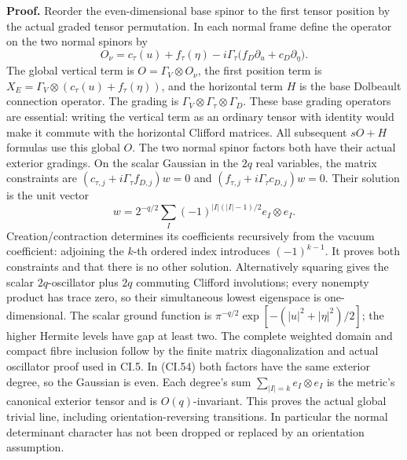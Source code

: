 \documentclass[
  11pt,
]{article}
\begin{document}
\textbf{Proof.} Reorder the even-dimensional base spinor to the first
tensor position by the actual graded tensor permutation. In each normal
frame define the operator on the two normal spinors by \[
 O_\nu=c_\tau(u)+f_\tau(\eta)
       -i\Gamma_\tau\bigl(f_D\partial_u+c_D\partial_\eta\bigr).
 \tag{CI.53}
\] The global vertical term is \(O=\Gamma_V\otimes O_\nu\), the first
position term is \(X_E=\Gamma_V\otimes(c_\tau(u)+f_\tau(\eta))\), and
the horizontal term \(H\) is the base Dolbeault connection operator. The
grading is \(\Gamma_V\otimes\Gamma_\tau\otimes\Gamma_D\). These base
grading operators are essential: writing the vertical term as an
ordinary tensor with identity would make it commute with the horizontal
Clifford matrices. All subsequent \(sO+H\) formulas use this global
\(O\). The two normal spinor factors both have their actual exterior
gradings. On the scalar Gaussian in the \(2q\) real variables, the
matrix constraints are \((c_{\tau,j}+i\Gamma_\tau f_{D,j})w=0\) and
\((f_{\tau,j}+i\Gamma_\tau c_{D,j})w=0\). Their solution is the unit
vector \[
 w=2^{-q/2}\sum_{I}
       (-1)^{|I|(|I|-1)/2}e_I\otimes e_I .
 \tag{CI.54}
\] Creation/contraction determines its coefficients recursively from the
vacuum coefficient: adjoining the \(k\)-th ordered index introduces
\((-1)^{k-1}\). It proves both constraints and that there is no other
solution. Alternatively squaring gives the scalar \(2q\)-oscillator plus
\(2q\) commuting Clifford involutions; every nonempty product has trace
zero, so their simultaneous lowest eigenspace is one-dimensional. The
scalar ground function is \(\pi^{-q/2}\exp[-(|u|^2+|\eta|^2)/2]\); the
higher Hermite levels have gap at least two. The complete weighted
domain and compact fibre inclusion follow by the finite matrix
diagonalization and actual oscillator proof used in CI.5. In (CI.54)
both factors have the same exterior degree, so the Gaussian is even.
Each degree's sum \(\sum_{|I|=k}e_I\otimes e_I\) is the metric's
canonical exterior tensor and is \(O(q)\)-invariant. This proves the
actual global trivial line, including orientation-reversing transitions.
In particular the normal determinant character has not been dropped or
replaced by an orientation assumption.
\end{document}
